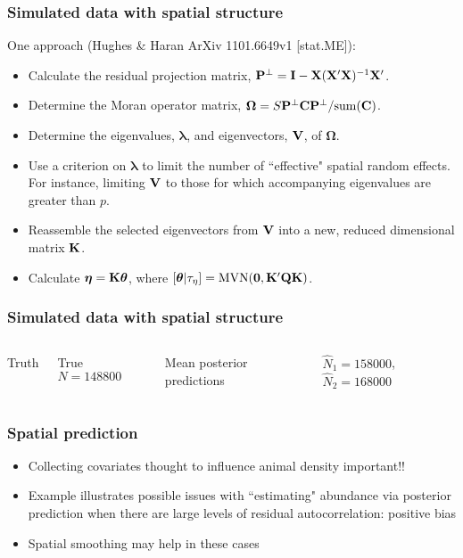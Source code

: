 \documentclass[serif,mathserif]{beamer}
\begin{document}
\begin{frame}
  \frametitle{Simulated data with spatial structure}
      One approach (Hughes \& Haran ArXiv 1101.6649v1 [stat.ME]):
      \begin{itemize}
  \item Calculate the residual projection matrix, ${\bf P}^\bot = {\bf I}-{\bf X}({\bf X}^\prime{\bf X})^{-1}{\bf X}^\prime$.
 \item Determine the Moran operator matrix, $\boldsymbol{\Omega}=S {\bf P}^\bot {\bf C}{\bf P}^\bot / {\rm sum}({\bf C})$.
 \item Determine the eigenvalues, $\boldsymbol{\lambda}$, and eigenvectors, ${\bf V}$, of $\boldsymbol{\Omega}$.
 \item Use a criterion on $\boldsymbol{\lambda}$ to limit the number of ``effective" spatial random effects.  For instance, limiting ${\bf V}$ to those for which accompanying eigenvalues are greater than $p$.
 \item Reassemble the selected eigenvectors from ${\bf V}$ into a new, reduced dimensional matrix ${\bf K}$.
 \item Calculate $\boldsymbol{\eta}={\bf K}\boldsymbol{\theta}$, where $[\boldsymbol{\theta}|\tau_{\eta}]= {\rm MVN}({\bf 0},{\bf K}^\prime {\bf Q} {\bf K})$.      \end{itemize}
 \end{frame}

\begin{frame}
  \frametitle{Simulated data with spatial structure}
  \begin{columns}
  \column{2in}
  Truth \vspace{.5cm}

  True $N=148800$

  \column{2in}
  Mean posterior predictions \vspace{.5cm}

  $\hat{N}_1=158000$,$\hat{N}_2=168000$
  \end{columns}
\end{frame}

\begin{frame}
    \frametitle{Spatial prediction}
    \begin{itemize}
      \item Collecting covariates thought to influence animal density important!!
      \item Example illustrates possible issues with ``estimating" abundance via posterior prediction when there are large levels of residual autocorrelation: positive bias
      \item Spatial smoothing may help in these cases
    \end{itemize}
\end{frame}
\end{document}

